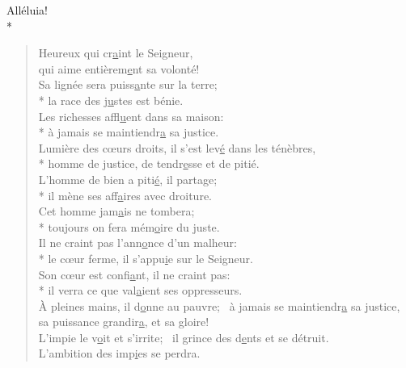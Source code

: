 Alléluia! \\*
\begin{verse}
Heureux qui cr\underline{a}int le Seigneur, \\
qui aime entièrem\underline{e}nt sa volonté! \\
Sa lignée sera puiss\underline{a}nte sur la terre; \\*
la race des j\underline{u}stes est bénie. \\

Les richesses affl\underline{u}ent dans sa maison: \\*
à jamais se maintiendr\underline{a} sa justice. \\
Lumière des cœurs droits, il s’est lev\underline{é} dans les ténèbres, \\*
homme de justice, de tendr\underline{e}sse et de pitié. \\

L’homme de bien a piti\underline{é}, il partage; \\*
il mène ses aff\underline{a}ires avec droiture. \\
Cet homme jam\underline{a}is ne tombera; \\*
toujours on fera mém\underline{o}ire du juste. \\

Il ne craint pas l’ann\underline{o}nce d’un malheur: \\*
le cœur ferme, il s’appu\underline{i}e sur le Seigneur. \\
Son cœur est confi\underline{a}nt, il ne craint pas: \\*
il verra ce que val\underline{a}ient ses oppresseurs. \\

À pleines mains, il d\underline{o}nne au pauvre;~\psalmdagger
à jamais se maintiendr\underline{a} sa justice, \\
sa puissance grandir\underline{a}, et sa gloire! \\

L’impie le v\underline{o}it et s’irrite;~\psalmdagger
il grince des d\underline{e}nts et se détruit. \\
L’ambition des imp\underline{i}es se perdra. \\
\end{verse}

